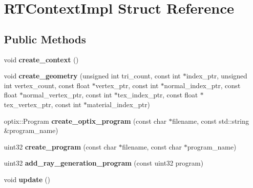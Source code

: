 \hypertarget{struct_r_t_context_impl}{}\section{R\+T\+Context\+Impl Struct Reference}
\label{struct_r_t_context_impl}
\subsection*{Public Methods}
\begin{DoxyCompactItemize}
\item 
\mbox{\label{struct_r_t_context_impl_af903f24be9478fdde22706667ce5ca1c}} 
void {\bfseries create\+\_\+context} ()
\item 
\mbox{\label{struct_r_t_context_impl_a7b16a2183adfc1820aaf21f85f510f27}} 
void {\bfseries create\+\_\+geometry} (unsigned int tri\+\_\+count, const int $\ast$index\+\_\+ptr, unsigned int vertex\+\_\+count, const float $\ast$vertex\+\_\+ptr, const int $\ast$normal\+\_\+index\+\_\+ptr, const float $\ast$normal\+\_\+vertex\+\_\+ptr, const int $\ast$tex\+\_\+index\+\_\+ptr, const float $\ast$tex\+\_\+vertex\+\_\+ptr, const int $\ast$material\+\_\+index\+\_\+ptr)
\item 
\mbox{\label{struct_r_t_context_impl_aa10208fdf297c0057ce767cf6b5138be}} 
optix\+::\+Program {\bfseries create\+\_\+optix\+\_\+program} (const char $\ast$filename, const std\+::string \&program\+\_\+name)
\item 
\mbox{\label{struct_r_t_context_impl_a34a20085c8f05ad18590057e3cc7dfcc}} 
uint32 {\bfseries create\+\_\+program} (const char $\ast$filename, const char $\ast$program\+\_\+name)
\item 
\mbox{\label{struct_r_t_context_impl_a8ccd378a87b5e5ef99da715571a2d870}} 
uint32 {\bfseries add\+\_\+ray\+\_\+generation\+\_\+program} (const uint32 program)
\item 
\mbox{\label{struct_r_t_context_impl_a71608b32ec8890758a63e7c78743128f}} 
void {\bfseries update} ()
\end{DoxyCompactItemize}
